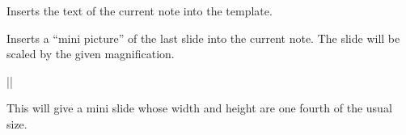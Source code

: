 \begin{command}{\insertnote}
  Inserts the text of the current note into the template.
\end{command}


\begin{command}{\insertslideintonotes{}}
  Inserts a ``mini picture'' of the last slide into the current
  note. The slide will be scaled by the given magnification.

  \example ||

  This will give a mini slide whose width and height are one fourth of
  the usual size.
\end{command}



